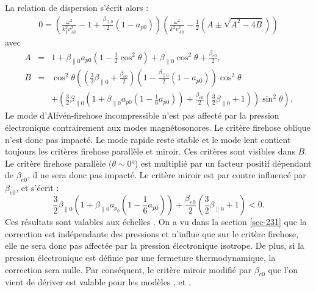  La relation de dispersion s'écrit alors : 
\begin{eqnarray}
 \label{eq:lin_cpgpe_disp}   0 = \left(\frac{\omega^2}{k^2_{\parallel} v^2_{A0}} - 1 +   \frac{\beta_{\parallel 0}}{2} \left(1-a_{p0}\right) \right)\left(\frac{\omega^2}{k^2 v^2_{A0}} - \frac{1}{2}\left(A \pm \sqrt{A^2-4B}\right)\right)
\end{eqnarray}
avec 
\begin{equation*}\begin{array}{rcl}
    A &=& 1+ \beta_{\parallel 0}a_{p0} \left(1-\frac{1}{2}\cos^2 \theta\right)+\beta_{\parallel 0}\cos^2 \theta + \frac{\beta_{e0}}{2}, \\
    B &=&\cos^2 \theta \left( \left(\frac{3}{2}\beta_{\parallel 0} + \frac{\beta_{e0}}{2}\right)\left(1-\frac{\beta_{\parallel 0}}{2} \left(1-a_{p0}\right)\right)\cos^2 \theta \right. \\
    && \left. + \left(\frac{3}{2}\beta_{\parallel 0}\left(1+\beta_{\parallel 0}a_{p0}\left(1-\frac{1}{6}a_{p0}\right)\right)+  \frac{\beta_{e0}}{2} \left(\frac{3}{2}\beta_{\parallel 0} + 1\right)\right)\sin^2 \theta \right) .
\end{array}\end{equation*}
Le mode d'Alfvén-firehose incompressible n'est pas affecté par la pression électronique contrairement aux modes magnétosonores. Le critère firehose oblique n'est donc pas impacté. Le mode rapide reste stable et le mode lent contient toujours les critères firehose parallèle et miroir. Ces critères sont visibles dans $B$. Le critère firehose parallèle ($\theta \sim \ang{0}$) est multiplié par un facteur positif dépendant de  $\beta_{e0}$, il ne sera donc pas impacté. Le critère miroir est par contre influencé par $\beta_{e0}$, et s'écrit : 
\begin{equation}
 \label{eq:crit_miroir_elec}   \frac{3}{2} \beta_{\parallel 0}\left(1 + \beta_{\parallel 0} a_{p_0}\left(1-\frac{1}{6}a_{p0}\right)\right) + \frac{\beta_{e 0}}{2}\left( \frac{3}{2} \beta_{\parallel 0} + 1\right) < 0 .
\end{equation}
Ces résultats sont valables aux échelles . On a vu dans la section \ref{sec-231} que la correction  est indépendante des pressions et n'influe que sur le critère firehose, elle ne sera donc pas affectée par la pression électronique isotrope. De plus, si la pression électronique est définie par une fermeture thermodynamique, la correction  sera nulle. Par conséquent, le critère miroir modifié par $\beta_{e0}$ que l'on vient de dériver est valable pour les modèles ,  et . 

